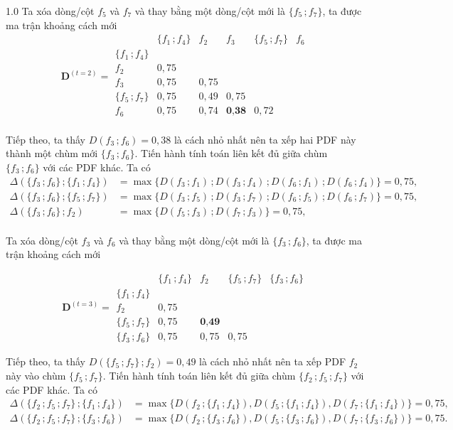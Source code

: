 \documentclass[a4paper,oneside]{book} %
\theoremstyle{plain}
\theoremstyle{plain}
\theoremstyle{nonumberplain}
\begin{document}
\begin{spacing}{1.0}
Ta xóa dòng/cột $f_5$ và $f_7$ và thay bằng một dòng/cột mới là $\{f_5\,;f_7\}$, ta được ma trận khoảng cách mới
$$
\bm D^{(t=2)} =
\begin{array}{c|ccccc}
	& \{f_1\,;f_4\} & f_2   & f_3   & \{f_5\,;f_7\} & f_6\\
	\hline
	\{f_1\,;f_4\}   &         &        &        &      &  \\
	f_2           & 0{,}75  &        &        &   &    \\
	f_3           & 0{,}75  & 0{,}75 &        &    &    \\
	\{f_5\,;f_7\}   & 0{,}75  & {0{,}49} & 0{,}75 &     \\
	f_6 &0{,}75&0{,}74&\textbf{0{,}38}& 0{,}72\\   
\end{array}
$$

Tiếp theo, ta thấy $D(f_3\,;f_6) = 0{,}38$ là cách nhỏ nhất nên ta xếp hai PDF này thành một chùm mới $\{f_3\,;f_6\}$. Tiến hành tính toán liên kết đủ giữa chùm $\{f_3\,;f_6\}$ với các PDF khác. Ta có
\begin{align*}
	\Delta(\{f_3\,;f_6\}\,; \{f_1\,;f_4\})&=\max\{D(f_3\,;f_1)\,; D(f_3\,;f_4)\,; D(f_6\,;f_1)\,; D(f_6\,;f_4)\} =0{,}75,\\
	\Delta(\{f_3\,;f_6\}\,; \{f_5\,;f_7\})&=\max\{D(f_3\,;f_5)\,; D(f_3\,;f_7)\,; D(f_6\,;f_5)\,; D(f_6\,;f_7)\} =0{,}75,\\
	\Delta(\{f_3\,;f_6\}\,; f_2)&=\max\{D(f_5\,;f_3)\,; D(f_7\,;f_3)\} = 0{,}75,\\
\end{align*}

Ta xóa dòng/cột $f_3$ và $f_6$ và thay bằng một dòng/cột mới là $\{f_3\,;f_6\}$, ta được ma trận khoảng cách mới

$$
\bm D^{(t=3)} =
\begin{array}{c|cccc}
	& \{f_1\,;f_4\} & f_2   & \{f_5\,;f_7\} & \{f_3\,;f_6\} \\
	\hline
	\{f_1\,;f_4\}     &         &        &        &        \\
	f_2             & 0{,}75  &        &        &        \\
	\{f_5\,;f_7\}     & 0{,}75  & \textbf{0{,}49} &       &        \\
	\{f_3\,;f_6\}     & 0{,}75  & 0{,}75 & 0{,}75 &        
\end{array}
$$

Tiếp theo, ta thấy $D(\{f_5\,;f_7\}\,;f_2) = 0{,}49$ là cách nhỏ nhất nên ta xếp PDF $f_2$ này vào chùm $\{f_5\,;f_7\}$. Tiến hành tính toán liên kết đủ giữa chùm $\{f_2\,;f_5\,;f_7\}$ với các PDF khác. Ta có
\begin{align*}
	\Delta(\{f_2\,; f_5\,; f_7\}\,; \{f_1\,; f_4\}) &= \max\{ D(f_2\,; \{f_1\,;f_4\}), D(f_5\,; \{f_1\,;f_4\}), D(f_7\,; \{f_1\,;f_4\}) \} = 0{,}75, \\
	\Delta(\{f_2\,; f_5\,; f_7\}\,; \{f_3\,; f_6\}) &= \max\{ D(f_2\,; \{f_3\,;f_6\}), D(f_5\,; \{f_3\,;f_6\}), D(f_7\,; \{f_3\,;f_6\}) \} = 0{,}75.
\end{align*}


\end{spacing}
\end{document}
